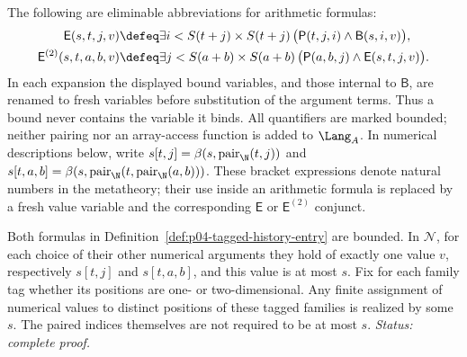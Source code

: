 \begin{definition}
\label{def:p04-tagged-history-entry}
The following are eliminable abbreviations for arithmetic formulas:
\[
\begin{aligned}
 \mathsf E(s,t,j,v)&\defeq
   \exists i<S(t+j)\times S(t+j)\,
   \bigl(\mathsf P(t,j,i)\land\mathsf B(s,i,v)\bigr),\\
 \mathsf E^{(2)}(s,t,a,b,v)&\defeq
   \exists j<S(a+b)\times S(a+b)\,
   \bigl(\mathsf P(a,b,j)\land\mathsf E(s,t,j,v)\bigr).
\end{aligned}
\]
In each expansion the displayed bound variables, and those internal to
\(\mathsf B\), are renamed to fresh variables before substitution of
the argument terms.  Thus a bound never contains the variable it binds.
All quantifiers are marked bounded; neither pairing nor an array-access
function is added to \(\Lang_A\).  In numerical descriptions below,
write \(s[t,j]=\beta(s,\operatorname{pair}_{\N}(t,j))\) and
\(s[t,a,b]=\beta(s,\operatorname{pair}_{\N}
 (t,\operatorname{pair}_{\N}(a,b)))\).
These bracket expressions denote natural numbers in the metatheory;
their use inside an arithmetic formula is replaced by a fresh value
variable and the corresponding \(\mathsf E\) or \(\mathsf E^{(2)}\)
conjunct.
\end{definition}

\begin{lemma}
\label{lem:p04-tagged-history-extraction}
Both formulas in Definition~\ref{def:p04-tagged-history-entry} are
bounded.  In \(\mathcal N\), for each choice of their other numerical
arguments they hold of exactly one value \(v\), respectively
\(s[t,j]\) and \(s[t,a,b]\), and this value is at most \(s\).
Fix for each family tag whether its positions are one- or two-dimensional.
Any finite assignment of numerical values to distinct positions of these
tagged families is realized by some \(s\).  The paired indices themselves are not
required to be at most \(s\).
\textit{Status: complete proof.}
\end{lemma}

